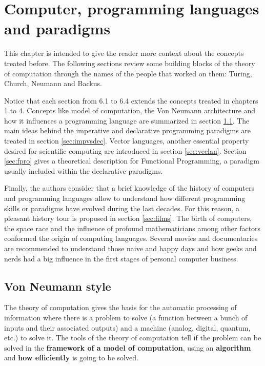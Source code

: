 \chapter{Computer, programming languages and paradigms} 

This chapter is intended to give the reader more context about the concepts treated before.  
The following sections review some building blocks of the theory of computation 
through the names of the people that worked on them: Turing, Church, Neumann and Backus.

Notice that each section from 6.1 to 6.4 extends the concepts treated in chapters 1 to 4.
Concepts like model of computation, the Von Neumann architecture and how it influences a programming language are summarized in section \ref{sec:vonNeu}.
The main ideas behind the imperative and declarative programming paradigms are treated in section \ref{sec:impvsdec}.
Vector languages, another essential property desired for scientific computing are introduced in section \ref{sec:veclan}.
Section \ref{sec:fpro} gives a theoretical description for Functional Programming, a paradigm usually included within the declarative paradigms. 
 
Finally, the authors consider that a brief knowledge of the history of computers and programming languages 
allow to understand how different programming skills or paradigms have evolved during the last decades. 
For this reason, a pleasant history tour is proposed in section \ref{sec:films}. 
The birth of computers, the space race and the influence of profound mathematicians among other factors conformed the origin of computing languages. 
Several movies and documentaries are recommended to understand those naive and happy days and how geeks and nerds had a big influence in the first stages of personal computer business.
  
  
   
  
  
 

    \newpage   
    \section{Von Neumann style}  \label{sec:vonNeu}
The theory of computation gives the basis for the automatic processing of information where there is a 
problem to solve (a function between a bunch of inputs and their associated outputs) 
and a machine (analog, digital, quantum, etc.) to solve it. 
The tools of the theory of computation tell 
if the problem can be solved in the \textbf{framework of a model of computation}, 
using an \textbf{algorithm} and 
\textbf{how efficiently} is going to be solved.

